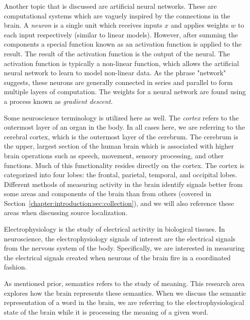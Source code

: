 Another topic that is discussed are artificial neural networks. These are 
computational systems which are vaguely inspired by the connections in the 
brain. A \emph{neuron} is a single unit which receives inputs $x$ and applies 
weights $w$ to each input respectively (similar to linear models). However, 
after summing the components a special function known as an activation function 
is applied to the result. The result of the activation function is the output 
of the neural. The activation function is typically a non-linear function, 
which allows the artificial neural network to learn to model non-linear data.  
As the phrase "network" suggests, these neurons are generally connected in 
series and parallel to form multiple layers of computation. The weights for a 
neural network are found using a process known as \emph{gradient descent}. 

Some neuroscience terminology is utilized here as well. The \emph{cortex} 
refers to the outermost layer of an organ in the body. In all cases here, we 
are referring to the cerebral cortex, which is the outermost layer of the 
cerebrum. The cerebrum is the upper, largest section of the human brain which 
is associated with higher brain operations such as speech, movement, sensory 
processing, and other functions. Much of this functionality resides directly on 
the cortex. The cortex is categorized into four lobes: the frontal, parietal, 
temporal, and occipital lobes. Different methods of measuring activity in the 
brain identify signals better from some areas and components of the brain than 
from others (covered in Section~\ref{chapter:introduction:sec:collection}), and 
we will also reference these areas when discussing source localization.

Electrophysiology is the study of electrical activity in biological tissues. In 
neuroscience, the electrophysiology signals of interest are the electrical 
signals from the nervous system of the body. Specifically, we are interested in 
measuring the electrical signals created when neurons of the brain fire in a 
coordinated fashion.

As mentioned prior, semantics refers to the study of meaning. This research 
area explores how the brain represents these semantics. When we discuss the 
semantic representation of a word in the brain, we are referring to the 
electrophysiological state of the brain while it is processing the meaning of a 
given word.
